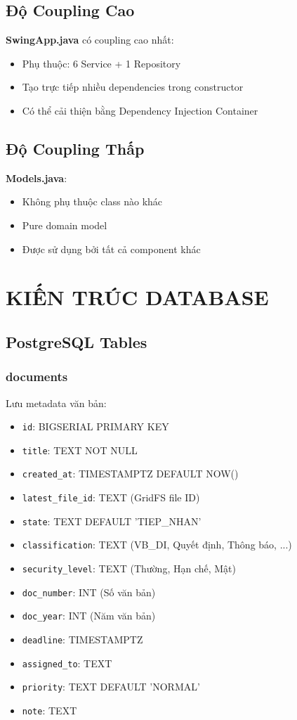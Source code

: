 \documentclass[12pt,a4paper]{article}
\begin{document}
\subsection{Độ Coupling Cao}

\textbf{SwingApp.java} có coupling cao nhất:
\begin{itemize}
    \item Phụ thuộc: 6 Service + 1 Repository
    \item Tạo trực tiếp nhiều dependencies trong constructor
    \item Có thể cải thiện bằng Dependency Injection Container
\end{itemize}

\subsection{Độ Coupling Thấp}

\textbf{Models.java}:
\begin{itemize}
    \item Không phụ thuộc class nào khác
    \item Pure domain model
    \item Được sử dụng bởi tất cả component khác
\end{itemize}

\section{KIẾN TRÚC DATABASE}

\subsection{PostgreSQL Tables}

\subsubsection{documents}
Lưu metadata văn bản:
\begin{itemize}
    \item \texttt{id}: BIGSERIAL PRIMARY KEY
    \item \texttt{title}: TEXT NOT NULL
    \item \texttt{created\_at}: TIMESTAMPTZ DEFAULT NOW()
    \item \texttt{latest\_file\_id}: TEXT (GridFS file ID)
    \item \texttt{state}: TEXT DEFAULT 'TIEP\_NHAN'
    \item \texttt{classification}: TEXT (VB\_DI, Quyết định, Thông báo, ...)
    \item \texttt{security\_level}: TEXT (Thường, Hạn chế, Mật)
    \item \texttt{doc\_number}: INT (Số văn bản)
    \item \texttt{doc\_year}: INT (Năm văn bản)
    \item \texttt{deadline}: TIMESTAMPTZ
    \item \texttt{assigned\_to}: TEXT
    \item \texttt{priority}: TEXT DEFAULT 'NORMAL'
    \item \texttt{note}: TEXT
\end{itemize}
\end{document}
